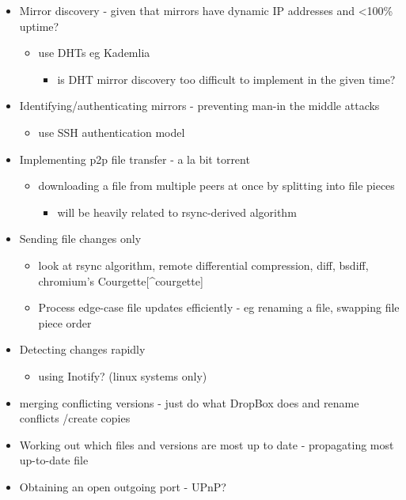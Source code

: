 \documentclass[12pt,a4paper,]{adreport}
\begin{document}
\begin{itemize}
\itemsep1pt\parskip0pt
\item
  Mirror discovery - given that mirrors have dynamic IP addresses and
  \textless{}100\% uptime?

  \begin{itemize}
  \itemsep1pt\parskip0pt
  \item
    use DHTs eg Kademlia

    \begin{itemize}
    \itemsep1pt\parskip0pt
    \item
      is DHT mirror discovery too difficult to implement in the given
      time?
    \end{itemize}
  \end{itemize}
\item
  Identifying/authenticating mirrors - preventing man-in the middle
  attacks

  \begin{itemize}
  \itemsep1pt\parskip0pt
  \item
    use SSH authentication model
  \end{itemize}
\item
  Implementing p2p file transfer - a la bit torrent

  \begin{itemize}
  \itemsep1pt\parskip0pt
  \item
    downloading a file from multiple peers at once by splitting into
    file pieces

    \begin{itemize}
    \itemsep1pt\parskip0pt
    \item
      will be heavily related to rsync-derived algorithm
    \end{itemize}
  \end{itemize}
\item
  Sending file changes only

  \begin{itemize}
  \itemsep1pt\parskip0pt
  \item
    look at rsync algorithm, remote differential compression, diff,
    bsdiff, chromium's Courgette{[}\^{}courgette{]}
  \item
    Process edge-case file updates efficiently - eg renaming a file,
    swapping file piece order
  \end{itemize}
\item
  Detecting changes rapidly

  \begin{itemize}
  \itemsep1pt\parskip0pt
  \item
    using Inotify? (linux systems only)
  \end{itemize}
\item
  merging conflicting versions - just do what DropBox does and rename
  conflicts /create copies
\item
  Working out which files and versions are most up to date - propagating
  most up-to-date file
\item
  Obtaining an open outgoing port - UPnP?
\end{itemize}
\end{document}
